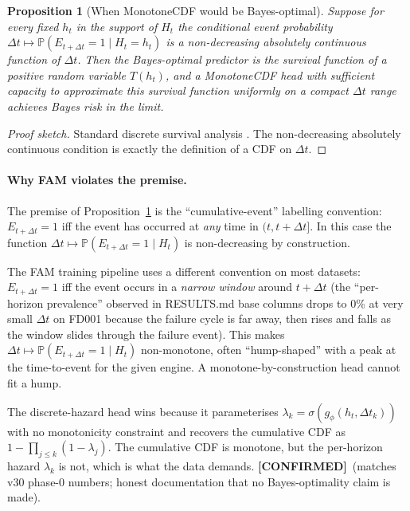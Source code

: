 \documentclass[11pt]{article}
\newtheorem{proposition}{Proposition}
\newcommand{\PP}{\mathbb{P}}
\newcommand{\CONF}{{\color{black!60!green}\textbf{[CONFIRMED]}}}
\begin{document}
\begin{proposition}[When MonotoneCDF would be Bayes-optimal]
\label{prop:monotone}
Suppose for every fixed $h_t$ in the support of $H_t$ the conditional
event probability $\Delta t\mapsto \PP(E_{t+\Delta t}=1\mid H_t=h_t)$ is
a non-decreasing absolutely continuous function of $\Delta t$. Then the
Bayes-optimal predictor is the survival function of a positive random
variable $T(h_t)$, and a MonotoneCDF head with sufficient capacity to
approximate this survival function uniformly on a compact $\Delta t$
range achieves Bayes risk in the limit.
\end{proposition}

\begin{proof}[Proof sketch]
Standard discrete survival analysis \citep{lee2018deephit}. The
non-decreasing absolutely continuous condition is exactly the definition
of a CDF on $\Delta t$.
\end{proof}

\paragraph{Why FAM violates the premise.}
The premise of Proposition~\ref{prop:monotone} is the
``cumulative-event'' labelling convention: $E_{t+\Delta t}=1$ iff the
event has occurred at \emph{any} time in $(t,t+\Delta t]$. In this
case the function $\Delta t\mapsto \PP(E_{t+\Delta t}=1\mid H_t)$ is
non-decreasing by construction.

The FAM training pipeline uses a different convention on most datasets:
$E_{t+\Delta t}=1$ iff the event occurs in a \emph{narrow window}
around $t+\Delta t$ (the ``per-horizon prevalence'' observed in
RESULTS.md base columns drops to 0\% at very small $\Delta t$ on FD001
because the failure cycle is far away, then rises and falls as the
window slides through the failure event). This makes
$\Delta t\mapsto \PP(E_{t+\Delta t}=1\mid H_t)$ non-monotone, often
``hump-shaped'' with a peak at the time-to-event for the given engine.
A monotone-by-construction head cannot fit a hump.

The discrete-hazard head wins because it parameterises
$\lambda_k=\sigma(g_\phi(h_t,\Delta t_k))$ with no monotonicity
constraint and recovers the cumulative CDF as
$1-\prod_{j\le k}(1-\lambda_j)$. The cumulative CDF is monotone, but
the per-horizon hazard $\lambda_k$ is not, which is what the data
demands. \CONF\ (matches v30 phase-0 numbers; honest documentation
that no Bayes-optimality claim is made).
\end{document}
